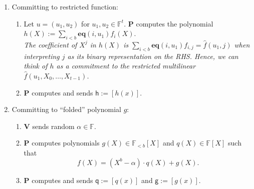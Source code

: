 \documentclass[11pt]{article} %
\newcommand{\F}{\ensuremath{\mathbb F}\xspace}
\newcommand{\defeq}{:=}
\newcommand{\enc}[1]{\ensuremath{\left[#1\right]}\xspace}
\newcommand{\prv}{\ensuremath{\mathsf{\mathbf{P}}}\xspace}
\newcommand{\ver}{\ensuremath{\mathsf{\mathbf{V}}}\xspace}
\newcommand{\polysofdeg}[1]{\ensuremath{\F_{< #1}[X]}\xspace}
\newcommand{\polys}{\ensuremath{\F[X]}\xspace}
\newcommand{\sumi}[1]{\sum_{i< #1}}
\newtheorem{remark}[lemma]{Remark}
\newcommand{\h}{\ensuremath{\mathsf{h}}\xspace}
\renewcommand{\g}{\ensuremath{\mathsf{g}}\xspace}
\newcommand{\q}{\ensuremath{\mathsf{q}}\xspace}
\newcommand{\eq}{\ensuremath{\mathsf{eq}}\xspace}
\renewcommand{\eq}{\ensuremath{\mathbf{eq}}\xspace}
\newcommand{\mle}[1]{\ensuremath{\hat{#1}}\xspace}
\begin{document}
\begin{enumerate}
 \item \textsf{Committing to restricted function:} \ 
\begin{enumerate}
\item Let $u=(u_1,u_2)$ for $u_1,u_2 \in \F^{t}$. \prv computes the polynomial $h(X)\defeq \sumi{b}\eq(i,u_1) f_i(X)$. \\ \noindent
\emph{The coefficient of $X^j$ in $h(X)$ is $\sumi{b}\eq(i,u_1) f_{i,j}=\mle{f}(u_1,j)$ when interpreting $j$ as its binary representation on the RHS.
Hence, we can think of $h$ as a commitment to the restricted multilinear $\mle{f}(u_1,X_0,\ldots,X_{t-1})$.}
 \item \prv computes and sends $\h\defeq\enc{h(x)}$.
 
 \end{enumerate}
\item \textsf{ Committing to  ``folded'' polynomial $g$:} 
\begin{enumerate}
 \item \ver sends random $\alpha \in \F$.
\item \prv computes polynomials $g(X) \in \polysofdeg{b}$ and $q(X)\in \polys$ such that
\[f(X)=(X^b-\alpha)\cdot q(X) + g(X).\]\label{step:modalpha}
\item \prv computes and sends $\q\defeq \enc{q(x)}$ and $\g\defeq \enc{g(x)}$.

\end{enumerate}


\end{enumerate}
\end{document}
